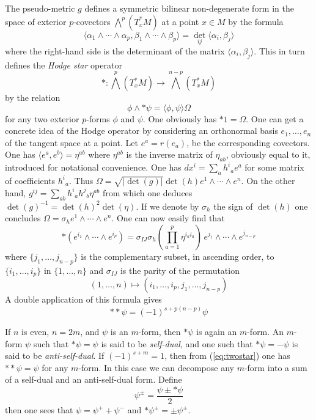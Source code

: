 \documentclass[12pt,titlepage]{article}
\begin{document}
The pseudo-metric \(g\) defines a symmetric bilinear non-degenerate form
in the space of exterior 
\(p\)-covectors \(\bigwedge^p(T_x^*M)\) at a point \(x\in M\) by
the formula
\[%
\langle\alpha_1\wedge\cdots\wedge\alpha_p , \beta_1\wedge\cdots\wedge\beta_p\rangle =
\det _{ij}\langle\alpha_i,\beta_j\rangle
\]%
where the right-hand side is the determinant of the matrix
\(\langle\alpha_i,\beta_j\rangle\).
This in turn defines the {\em Hodge star\/}
%
 operator
\[
*:{\textstyle \bigwedge^p}(T_x^*M) \to {\textstyle
\bigwedge^{n-p}}(T_x^*M)
\]
by the relation
\begin{equation}\label{eq:hodgestar}%
\phi \wedge *\psi = \langle \phi,\psi \rangle\Omega
\end{equation}%
for any two  exterior \(p\)-forms \(\phi\) and \(\psi\). One obviously has
\(*1=\Omega\).
One can get a concrete idea of the Hodge operator by considering an 
orthonormal basis 
 \(e_1,\dots,e_n\) of the tangent space at a point. Let \(e^a = r(e_a)\), 
be the corresponding covectors.
One has \(\langle e^a,e^b\rangle = \eta^{ab}\) where \(\eta^{ab}\) is the inverse
matrix of \(\eta_{ab}\), obviously equal to it, introduced for
notational convenience. One has \(dx^i = \sum_ah^i{}_ae^a\) for some
matrix of coefficients \(h^i{}_a\). Thus \(\Omega =
\sqrt{|\det(g)|}\det(h)e^1\wedge\cdots\wedge e^n\). On the other hand,
\(g^{ij} = \sum_{ab} h^i{}_ah^j{}_b\eta^{ab}\) from which one deduces
\(\det(g)^{-1}=\det(h)^2 \det(\eta)\). If we denote by \(\sigma_h\) the
sign of \(\det(h)\) one concludes \(\Omega = \sigma_he^1\wedge
\cdots\wedge e^n\). One can now easily find that
\begin{equation}%
*(e^{i_1}\wedge\cdots\wedge e^{i_p})   =
\sigma_{IJ}\sigma_h({\textstyle \prod_{a=1}^p}\eta^{i_ai_a}) \,
e^{j_1}\wedge\cdots\wedge e^{j_{n-p}}
\end{equation}%
where \(\{j_1,\dots,j_{n-p}\}\) is the complementary subset,
in ascending order, to
\(\{i_1,\dots,i_{p}\}\)  in \(\{1,\dots,n\}\) and \(\sigma_{IJ}\) is
the
parity of the permutation
\[
(1,\dots,n) \mapsto
(i_1,\dots,i_p,j_1,\dots,j_{n-p})
\]
A double application of this formula gives 
\begin{equation}\label{eq:twostar}%
**\psi =
(-1)^{s+p(n-p)}\psi
\end{equation}%


If \(n\) is even, \(n=2m\), and \(\psi\) is an \(m\)-form, then \(*\psi\)
is again an \(m\)-form. An \(m\)-form \(\psi\) such that \(*\psi=\psi\)
is said to be {\em self-dual\/}, 
%
and one such that  \(*\psi=-\psi\)
is said to be {\em anti-self-dual\/}. 
%
If \((-1)^{s+m}=1\), then
from (\ref{eq:twostar}) one has \(**\psi=\psi\) for any \(m\)-form. In
this case we can decompose any \(m\)-form into a sum of a self-dual and
an anti-self-dual form. Define
\[%
\psi^\pm = \frac{\psi\pm *\psi}{2}
\]%
then one sees that \(\psi=\psi^++\psi^-\) and \(*\psi^\pm=\pm\psi^\pm\).
%
%
\end{document}

